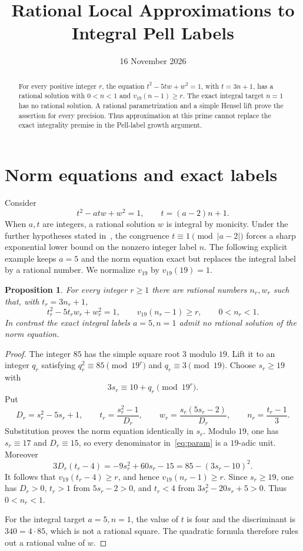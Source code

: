 \documentclass[11pt,a4paper]{article}
\title{Rational Local Approximations to Integral Pell Labels}
\author{}\date{16 November 2026}
\newtheorem{proposition}[theorem]{Proposition}
\theoremstyle{definition}\newtheorem{definition}[theorem]{Definition}
\theoremstyle{remark}\newtheorem{remark}[theorem]{Remark}
\begin{document}
\maketitle
\begin{abstract}
For every positive integer $r$, the equation
$t^2-5tw+w^2=1$, with $t=3n+1$, has a rational solution with
$0<n<1$ and $v_{19}(n-1)\ge r$. The exact integral target
$n=1$ has no rational solution. A rational parametrization and
a simple Hensel lift prove the assertion for every precision.
Thus approximation at this prime cannot replace the exact
integrality premise in the Pell-label growth argument.
\end{abstract}

\section{Norm equations and exact labels}
Consider
\begin{equation}\label{eq:norm}
                    t^2-atw+w^2=1,\qquad t=(a-2)n+1.
\end{equation}
When $a,t$ are integers, a rational solution $w$ is integral by
monicity. Under the further hypotheses stated in~\cite{IntegralLabels},
the congruence $t\equiv1\pmod{|a-2|}$ forces a sharp exponential
lower bound on the nonzero integer label $n$. The following explicit
example keeps $a=5$ and the norm equation exact but replaces the
integral label by a rational number. We normalize $v_{19}$ by
$v_{19}(19)=1$.

\begin{proposition}\label{prop:local}
For every integer $r\ge1$ there are rational numbers $n_r,w_r$ such
that, with $t_r=3n_r+1$,
\[
 t_r^2-5t_rw_r+w_r^2=1,\qquad
 v_{19}(n_r-1)\ge r,\qquad 0<n_r<1.
\]
In contrast the exact integral labels $a=5,n=1$ admit no rational
solution of the norm equation.
\end{proposition}
\begin{proof}
The integer $85$ has the simple square root $3$ modulo $19$.
Lift it to an integer $q_r$ satisfying
$q_r^2\equiv85\pmod{19^r}$ and $q_r\equiv3\pmod{19}$.
Choose $s_r\ge19$ with
\[
                       3s_r\equiv10+q_r\pmod{19^r}.
\]
Put
\begin{equation}\label{eq:param}
 D_r=s_r^2-5s_r+1,\qquad
 t_r=\frac{s_r^2-1}{D_r},\qquad
 w_r=\frac{s_r(5s_r-2)}{D_r},\qquad
 n_r=\frac{t_r-1}{3}.
\end{equation}
Substitution proves the norm equation identically in $s_r$.
Modulo $19$, one has $s_r\equiv17$ and $D_r\equiv15$,
so every denominator in~\eqref{eq:param} is a $19$-adic unit.
Moreover
\[
 3D_r(t_r-4)=-9s_r^2+60s_r-15
                  =85-(3s_r-10)^2.
\]
It follows that $v_{19}(t_r-4)\ge r$, and hence
$v_{19}(n_r-1)\ge r$. Since $s_r\ge19$, one has $D_r>0$,
$t_r>1$ from $5s_r-2>0$, and $t_r<4$ from
$3s_r^2-20s_r+5>0$. Thus $0<n_r<1$.

For the integral target $a=5,n=1$, the value of $t$ is four and
the discriminant is $340=4\cdot85$, which is not a rational square.
The quadratic formula therefore rules out a rational value of $w$.
\end{proof}
\end{document}
